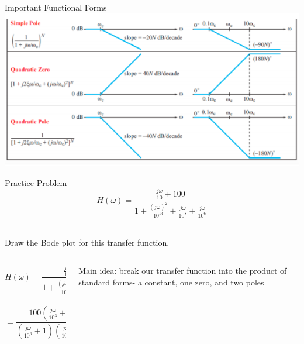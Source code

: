 \documentclass{beamer}
\begin{document}
    \begin{frame}{Important Functional Forms}
        \includegraphics[scale=0.75]{important-functional-forms-2.png}
    \end{frame}
    \begin{frame}{Practice Problem}
        $$H(\omega) = \frac{\frac{j\omega}{10} + 100}{1 + \frac{(j\omega)^2}{10^14} + \frac{j\omega}{10^8} + \frac{j\omega}{10^6}}$$\\
        \begin{center}
            Draw the Bode plot for this transfer function.
        \end{center}
    \end{frame}
    \begin{frame}{}
        \begin{columns}
            \begin{column}{0.5\textwidth}
                $$H(\omega) = \frac{\frac{j\omega}{10} + 100}{1 + \frac{(j\omega)^2}{10^14} + \frac{j\omega}{10^8} + \frac{j\omega}{10^6}}$$\\
                $$=\frac{100(\frac{j\omega}{10^3}+1)}{(\frac{j\omega}{10^6}+1)(\frac{j\omega}{10^8}+1)}
                $$
            \end{column}
            \begin{column}{0.5\textwidth}
                Main idea: break our transfer function into the product of standard forms- a constant, one zero, and two poles
            \end{column}
        \end{columns}
        
    \end{frame}
\end{document}
